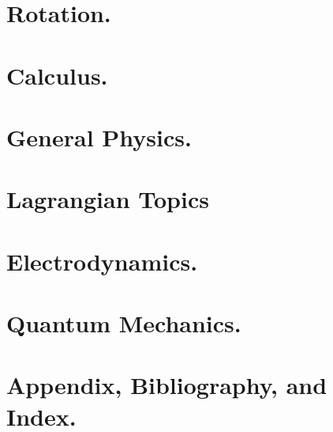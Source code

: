 \documentclass[12pt,leqno]{book}
\begin{document}
\part{Rotation.}





\part{Calculus.}





\part{General Physics.}







\part{Lagrangian Topics}




\part{Electrodynamics.}


\part{Quantum Mechanics.}


\part{Appendix, Bibliography, and Index.}


%





\end{document}
